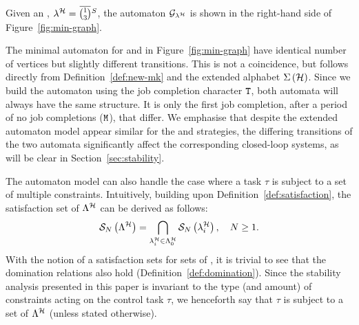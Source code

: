 \begin{example}%
    \label{ex:auto-skip}%
    Given an \ewhc{}, $\lambda^{\strat} = \overbar{\binom{1}{3}}^{S}$, the automaton $\mathcal{G}_{\lambda^{\mathcal{H}}}$ is shown in the right-hand side of Figure~\ref{fig:min-graph}.
\end{example}

The minimal automaton for \tK{} and \tS{} in Figure~\ref{fig:min-graph} have identical number of vertices but slightly different transitions.
This is not a coincidence, but follows directly from Definition~\ref{def:new-mk} and the extended alphabet $\Sigma\left(\mathcal{H}\right)$.
Since we build the automaton using the job completion character $\texttt{T}$, both automata will always have the same structure.
It is only the first job completion, after a period of no job completions ($\texttt{M}$), that differ.
We emphasise that despite the extended automaton model appear similar for the \tK{} and \tS{} strategies, the differing transitions of the two automata significantly affect the corresponding closed-loop systems, as will be clear in Section~\ref{sec:stability}.

The \tool{} automaton model can also handle the case where a task $\tau$ is subject to a set of multiple constraints.
Intuitively, building upon Definition~\ref{def:satisfaction}, the satisfaction set of $\Lambda^{\mathcal{H}}$ can be derived as follows:
%
\begin{equation}
    \label{eq:satisfaction-multi}
    \sset{N}{\Lambda^{\strat}} = \bigcap_{\lambda^{\strat}_i \in \Lambda^{\strat}_0} \sset{N}{\lambda^{\strat}_i}, \quad N \geq 1.
\end{equation}
%
With the notion of a satisfaction sets for sets of \ewhc{}, it is trivial to see that the domination relations also hold (Definition~\ref{def:domination}).
Since the stability analysis presented in this paper is invariant to the type (and amount) of constraints acting on the control task $\tau$, we henceforth say that $\tau$ is subject to a set of \ewhc{} $\Lambda^{\mathcal{H}}$ (unless stated otherwise).


